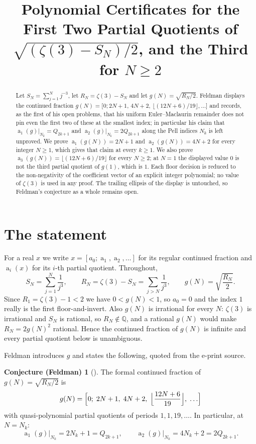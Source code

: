 \documentclass[11pt]{amsart}
\title[Certificates for leading partial quotients]
{Polynomial Certificates for the First Two Partial Quotients of
 $\sqrt{(\zeta(3)-S_N)/2}$, and the Third for $N\ge2$}
\date{}
\theoremstyle{definition}
\newtheorem*{conjecture}{Conjecture (Feldman)}
\theoremstyle{remark}
\DeclareMathOperator{\PQ}{a}
\newcommand{\Rt}{R}
\begin{document}
\begin{abstract}
Let $S_N=\sum_{j=1}^{N}j^{-3}$, let $\Rt_N=\zeta(3)-S_N$ and let
$g(N)=\sqrt{\Rt_N/2}$. Feldman displays the continued fraction
$g(N)=\bigl[0;2N+1,\,4N+2,\,\lfloor(12N+6)/19\rfloor,\ldots\bigr]$ and records, as
the first of his open problems, that his uniform Euler--Maclaurin remainder does
not pin even the first two of these at the smallest index; in particular his
claim that $\PQ_1(g)|_{N_k}=Q_{2k+1}$ and $\PQ_2(g)|_{N_k}=2Q_{2k+1}$ along the
Pell indices $N_k$ is left unproved. We prove $\PQ_1(g(N))=2N+1$ and
$\PQ_2(g(N))=4N+2$ for every integer $N\ge1$, which gives that claim at every
$k\ge1$. We also prove $\PQ_3(g(N))=\lfloor(12N+6)/19\rfloor$ for every $N\ge2$;
at $N=1$ the displayed value $0$ is not the third partial quotient of $g(1)$,
which is $1$. Each floor decision is reduced to the non-negativity of the
coefficient vector of an explicit integer polynomial; no value of $\zeta(3)$ is
used in any proof. The trailing ellipsis of the display is untouched, so
Feldman's conjecture as a whole remains open.
\end{abstract}

\maketitle

\section{The statement}

For a real $x$ we write $x=[a_0;\PQ_1,\PQ_2,\ldots]$ for its regular continued
fraction and $\PQ_i(x)$ for its $i$-th partial quotient. Throughout,
\[
 S_N=\sum_{j=1}^{N}\frac1{j^3},\qquad
 \Rt_N=\zeta(3)-S_N=\sum_{j>N}\frac1{j^3},\qquad
 g(N)=\sqrt{\frac{\Rt_N}{2}} .
\]
Since $\Rt_1=\zeta(3)-1<2$ we have $0<g(N)<1$, so $a_0=0$ and the index $1$
really is the first floor-and-invert. Also $g(N)$ is irrational for every $N$:
$\zeta(3)$ is irrational \cite{Apery,Beukers} and $S_N$ is rational, so
$\Rt_N\notin\mathbb Q$, and a rational $g(N)$ would make
$\Rt_N=2g(N)^2$ rational. Hence the continued fraction of $g(N)$ is infinite
and every partial quotient below is unambiguous.

Feldman \cite{Feldman} introduces $g$ and states the following, quoted from the
e-print source.

\begin{conjecture}[\cite{Feldman}]
The formal continued fraction of $g(N)=\sqrt{\Rt_N/2}$ is
\begin{equation}\label{eq:gcf}
 g(N)=\Bigl[0;\;2N+1,\;4N+2,\;
   \Bigl\lfloor\frac{12N+6}{19}\Bigr\rfloor,\;\ldots\Bigr]
\end{equation}
with quasi-polynomial partial quotients of periods $1,1,19,\ldots$. In
particular, at $N=N_k$:
\begin{equation}\label{eq:gcfpell}
 \PQ_1(g)\big|_{N_k}=2N_k+1=Q_{2k+1},\qquad
 \PQ_2(g)\big|_{N_k}=4N_k+2=2Q_{2k+1}.
\end{equation}
\end{conjecture}
\end{document}
